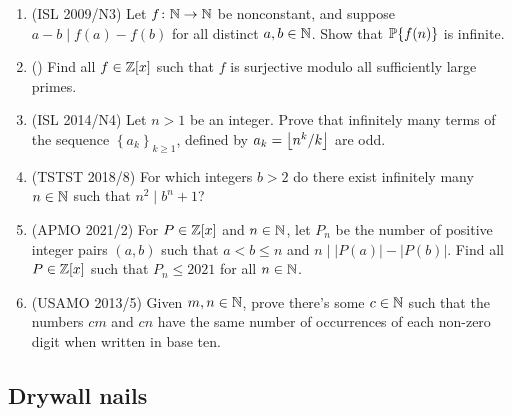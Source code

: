\documentclass[11pt,paper=letter]{scrartcl}
\newcommand{\seq}[1]{\left\{#1\right\}}
\newcommand{\primeseq}[1]{\PP\!\seq{#1}}
\begin{document}
\begin{enumerate}[resume]

\item (ISL 2009/N3) Let $f \colon \mathbb N \to \mathbb N$ be nonconstant, and suppose $a - b \mid f(a) - f(b)$ for all distinct $a, b \in \mathbb N$. Show that $\primeseq{f(n)}$ is infinite. \hint{\ref{h:8}}

\item (\href{https://artofproblemsolving.com/community/c6h2215487p16803077}{}) Find all $f \in \mathbb Z[x]$ such that $f$ is surjective modulo all sufficiently large primes. \hint{\ref{h:9}}

\item (ISL 2014/N4) Let $n > 1$ be an integer. Prove that infinitely many terms of the sequence $\seq{a_k}_{k \ge 1}$, defined by $a_k = \left\lfloor n^k/k \right\rfloor$ are odd. \hint{\ref{h:10}}

\item (TSTST 2018/8) For which integers $b > 2$ do there exist infinitely many $n \in \mathbb N$ such that $n^2 \mid b^n+1$? \hint{\ref{h:11}}

\item (APMO 2021/2) For $P \in \mathbb Z[x]$ and $n \in \mathbb N$, let $P_n$ be the number of positive integer pairs $(a,b)$ such that $a<b \leq n$ and $n \mid |P(a)|-|P(b)|$. Find all $P \in \mathbb Z[x]$ such that $P_n \leq 2021$ for all $n \in \mathbb N$. \hint{\ref{h:12}}

\item (USAMO 2013/5) Given $m, n \in \mathbb N$, prove there's some $c \in \mathbb N$ such that the numbers $cm$ and $cn$ have the same number of occurrences of each non-zero digit when written in base ten. \hint{\ref{h:13}}

\end{enumerate}

\subsection{Drywall nails}
\end{document}
